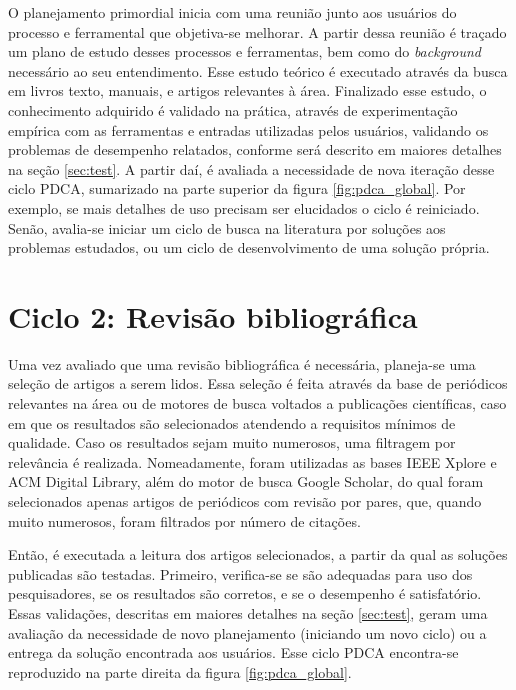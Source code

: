 \documentclass[cic,tc]{iiufrgs}
\begin{document}
O planejamento primordial inicia com uma reunião junto aos usuários do processo
e ferramental que objetiva-se melhorar. A partir dessa reunião é traçado um
plano de estudo desses processos e ferramentas, bem como do \textit{background}
necessário ao seu entendimento. Esse estudo teórico é executado através da
busca em livros texto, manuais, e artigos relevantes à área. Finalizado esse
estudo, o conhecimento adquirido é validado na prática, através de
experimentação empírica com as ferramentas e entradas utilizadas pelos
usuários, validando os problemas de desempenho relatados, conforme será
descrito em maiores detalhes na seção \ref{sec:test}. A partir daí, é avaliada
a necessidade de nova iteração desse ciclo PDCA, sumarizado na parte superior
da figura \ref{fig:pdca_global}. Por exemplo, se mais detalhes de uso precisam
ser elucidados o ciclo é reiniciado. Senão, avalia-se iniciar um ciclo de busca
na literatura por soluções aos problemas estudados, ou um ciclo de
desenvolvimento de uma solução própria. 

\section{Ciclo 2: Revisão bibliográfica}
\label{sec:lit}

Uma vez avaliado que uma revisão bibliográfica é necessária, planeja-se uma
seleção de artigos a serem lidos. Essa seleção é feita através da base de
periódicos relevantes na área ou de motores de busca voltados a publicações
científicas, caso em que os resultados são selecionados atendendo a requisitos
mínimos de qualidade. Caso os resultados sejam muito numerosos, uma filtragem
por relevância é realizada. Nomeadamente, foram utilizadas as bases IEEE Xplore
e ACM Digital Library, além do motor de busca Google Scholar, do qual foram
selecionados apenas artigos de periódicos com revisão por pares, que, quando
muito numerosos, foram filtrados por número de citações.

Então, é executada a leitura dos artigos selecionados, a partir da qual as
soluções publicadas são testadas. Primeiro, verifica-se se são adequadas para
uso dos pesquisadores, se os resultados são corretos, e se o desempenho é
satisfatório. Essas validações, descritas em maiores detalhes na seção
\ref{sec:test}, geram uma avaliação da necessidade de novo planejamento
(iniciando um novo ciclo) ou a entrega da solução encontrada aos usuários. Esse
ciclo PDCA encontra-se reproduzido na parte direita da figura
\ref{fig:pdca_global}.
\end{document}

